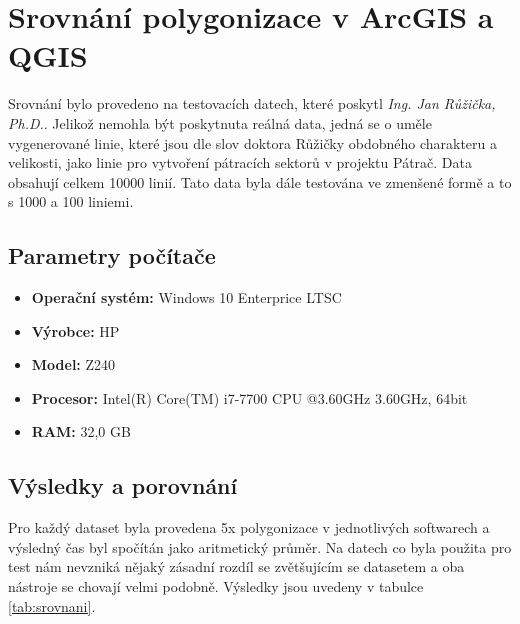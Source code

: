 \chapter{Srovnání polygonizace v ArcGIS a QGIS}
\label{chap:srovnani}
Srovnání bylo provedeno na testovacích datech, které poskytl \textit{Ing. Jan Růžička, Ph.D.}. Jelikož nemohla být poskytnuta reálná data, jedná se o uměle vygenerované linie, které jsou dle slov doktora Růžičky obdobného charakteru a velikosti, jako linie pro vytvoření pátracích sektorů v projektu Pátrač. Data obsahují celkem 10000 linií. Tato data byla dále testována ve zmenšené formě a to s 1000 a 100 liniemi.

\section{Parametry počítače}
\begin{itemize}
\item \textbf{Operační systém:} Windows 10 Enterprice LTSC
\item \textbf{Výrobce:} HP
\item \textbf{Model:} Z240
\item \textbf{Procesor:} Intel(R) Core(TM) i7-7700 CPU @3.60GHz 3.60GHz, 64bit
\item \textbf{RAM:} 32,0 GB
\end{itemize}

\section{Výsledky a porovnání}
Pro každý dataset byla provedena 5x polygonizace v jednotlivých softwarech a výsledný čas byl spočítán jako aritmetický průměr. Na datech co byla použita pro test nám nevzniká nějaký zásadní rozdíl se zvětšujícím se datasetem a oba nástroje se chovají velmi podobně. Výsledky jsou uvedeny v tabulce \ref{tab:srovnani}.

